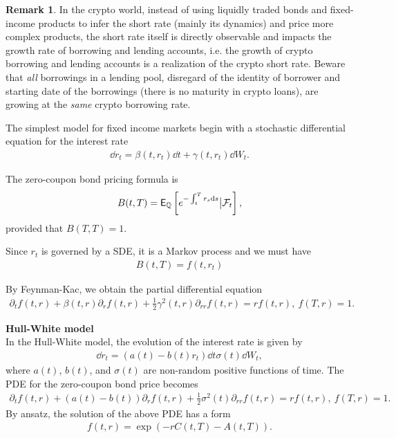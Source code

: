 \documentclass[square]{article} %
\theoremstyle{plain}
\theoremstyle{definition} %
\newtheorem{remark}[theorem]{Remark}
\begin{document}
\begin{remark}In the crypto world, instead of using liquidly traded bonds and fixed-income products to infer the short rate (mainly its dynamics) and price more complex products,
 the short rate itself is directly observable and impacts the growth rate of borrowing and lending accounts,
 i.e. the growth of crypto borrowing and lending accounts is a {\color{red} realization} of the crypto short rate.
 Beware that {\it all} borrowings in a lending pool, disregard of the identity of borrower and starting date of the borrowings (there is no maturity in crypto loans),
 are growing at the {\it{same}} crypto borrowing rate. \end{remark}

The simplest model for fixed income markets begin with a stochastic differential equation for the interest rate
\begin{align*}
  \dd r_t = \beta(t, r_t)\dd t + \gamma(t, r_t)\dd W_t.
\end{align*}

The zero-coupon bond pricing formula is
\begin{align*}
B(t,T) = {\mathbb{\sf E}}_\mathbb{Q}\left[
e^{-\int_t^T r_s {\rm d} s}\big|\mathcal{F}_t
\right],
\end{align*}
provided that $B(T,T)=1$. 

Since $r_t$ is governed by a SDE, it is a Markov process and we must have
\begin{align*}
B(t,T) = f(t, r_t)
\end{align*}

By Feynman-Kac, we obtain the partial differential equation
\begin{align*}
\partial_t f(t,r) + \beta(t,r)\partial_r f(t,r)+ \frac{1}{2}\gamma^2(t,r)\partial_{rr}f(t,r) = r f(t,r),\  
f(T, r)=1.
\end{align*}

{\bf Hull-White model}\\
In the Hull-White model, the evolution of the interest rate is given by 
\begin{align*}
\dd r_t = \left(a(t)-b(t)r_t\right)\dd t \sigma(t) \dd W_t,
\end{align*}
where $a(t)$, $b(t)$, and $\sigma(t)$ are non-random positive functions of time.
The PDE for the zero-coupon bond price becomes
\begin{align*}
  \partial_t f(t,r) + \left(a(t)-b(t)\right)\partial_r f(t,r)+ \frac{1}{2}\sigma^2(t)\partial_{rr}f(t,r) = r f(t,r),\  
  f(T, r)=1.
  \end{align*}
By ansatz, the solution of the above PDE has a form 
\begin{align*}
f(t,r) = \exp\left(-r C(t,T)- A(t,T)\right).
\end{align*}
\end{document}
